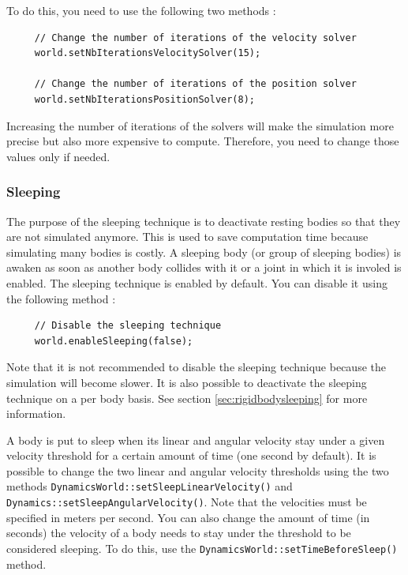\documentclass[a4paper,12pt]{article}
\begin{document}
    To do this, you need to use the following two methods : \\

    \begin{lstlisting}
     // Change the number of iterations of the velocity solver
     world.setNbIterationsVelocitySolver(15);

     // Change the number of iterations of the position solver
     world.setNbIterationsPositionSolver(8);
  \end{lstlisting}

    \vspace{0.6cm}

    Increasing the number of iterations of the solvers will make the simulation more precise but also more expensive to compute. Therefore, you need to change
    those values only if needed.

    \subsubsection{Sleeping}
    \label{sec:sleeping}

    The purpose of the sleeping technique is to deactivate resting bodies so that they are not simulated anymore. This is used to save computation time because simulating many bodies is costly.
    A sleeping body (or group of sleeping bodies) is awaken as soon as another body collides with it or a joint in which it is involed is enabled. The sleeping technique is enabled by
    default. You can disable it using the following method : \\

    \begin{lstlisting}
     // Disable the sleeping technique
     world.enableSleeping(false);
  \end{lstlisting}

    \vspace{0.6cm}

    Note that it is not recommended to disable the sleeping technique because the simulation will become slower. It is also possible to deactivate the sleeping technique on a
    per body basis. See section \ref{sec:rigidbodysleeping} for more information. \\

    \begin{sloppypar}
    A body is put to sleep when its linear and angular velocity stay under a given velocity threshold for a certain amount of time (one second by default). It is possible to change the two
    linear and angular velocity thresholds using the two methods \texttt{DynamicsWorld::setSleepLinearVelocity()} and \texttt{Dynamics::setSleepAngularVelocity()}. Note that the velocities must
    be specified in meters per second. You can also change the amount of time (in seconds) the velocity of a body needs to stay under the threshold to be considered sleeping. To do this, use the
    \texttt{DynamicsWorld::setTimeBeforeSleep()} method.
   \end{sloppypar}
    
\end{document}
